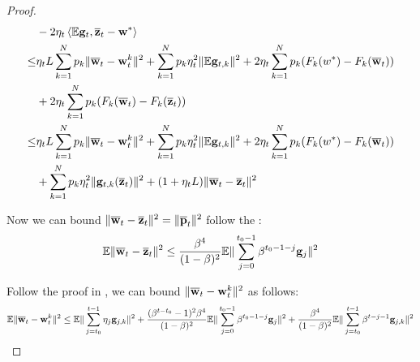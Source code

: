 \begin{proof}
\begin{align}
	& -2 \eta_{t} \left<\mathbb{E} {\mathbf{g}}_{t}, {\overline{\mathbf{z}}}_{t}-{\mathbf{w}}^{*}\right> \nonumber \\
\leq & \eta_t L \sum_{k=1}^N p_k  \|{\overline{\mathbf{w}}}_t - {\mathbf{w}}^{k}_t\|^2  + \sum_{k=1}^N p_k\eta_t^2 \|\mathbb{E} {\mathbf{g}}_{t,k}\|^2 	 + 2 \eta_{t} \sum_{k=1}^N p_k (F_k(w^*) - F_k({\overline{\mathbf{w}}}_t)) \nonumber \\
 & +  2 \eta_{t} \sum_{k=1}^N p_k  (F_k({\overline{\mathbf{w}}}_t) -  F_k({\overline{\mathbf{z}}}_t)) \\
\leq & \eta_t L \sum_{k=1}^N p_k  \|{\overline{\mathbf{w}}}_t - {\mathbf{w}}^{k}_t\|^2  + \sum_{k=1}^N p_k\eta_t^2 \|\mathbb{E} {\mathbf{g}}_{t,k}\|^2 	 + 2 \eta_{t} \sum_{k=1}^N p_k (F_k(w^*) - F_k({\overline{\mathbf{w}}}_t)) \nonumber \\
  & +  \sum_{k=1}^N p_k \eta_t^2\|{\mathbf{g}}_{t,k}({\overline{\mathbf{z}}}_t)\|^2 + (1+ \eta_t L)\|{\overline{\mathbf{w}}}_t - {\overline{\mathbf{z}}}_t\|^2 \label{eq:nasgdcvxsm3}
\end{align}

Now we can bound $\|{\overline{\mathbf{w}}}_t - {\overline{\mathbf{z}}}_t\|^2 = \| {\overline{\mathbf{p}}}_t\|^2$ follow the \eq{\ref{eq:nagcvx6}}: 
\begin{align}
	\mathbb{E} \|{\overline{\mathbf{w}}}_t - {\overline{\mathbf{z}}}_t\|^2 \leq \frac{\beta^4}{(1-\beta)^2}\mathbb{E}\|\sum_{j=0}^{t_0 - 1}\beta^{t_0-1-j}{\mathbf{g}}_j\|^2 
	\label{eq:nasgdcvxsm4}
\end{align}

Follow the proof in \eq{\ref{eq:nagcvx4-1}}, we can bound $\|{\overline{\mathbf{w}}}_t - {\mathbf{w}}^{k}_t\|^2$ as follows:
\begin{align}
	\mathbb{E} \|{\overline{\mathbf{w}}}_t - {\mathbf{w}}^{k}_t\|^2  \leq \mathbb{E} \|\sum_{j=t_0}^{t-1}\eta_j {\mathbf{g}}_{j,k}\|^2 + \frac{(\beta^{t-t_0}-1)^2\beta^4}{(1-\beta)^2}\mathbb{E}\|\sum_{j=0}^{t_0 - 1}\beta^{t_0-1-j}{\mathbf{g}}_j\|^2 + \frac{\beta^4}{(1 - \beta)^2} \mathbb{E}\|\sum_{j=t_0}^{t-1}\beta^{t-j-1}{\mathbf{g}}_{j,k}\|^2 \label{eq:nasgdcvxsm5}
\end{align}


\end{proof}
